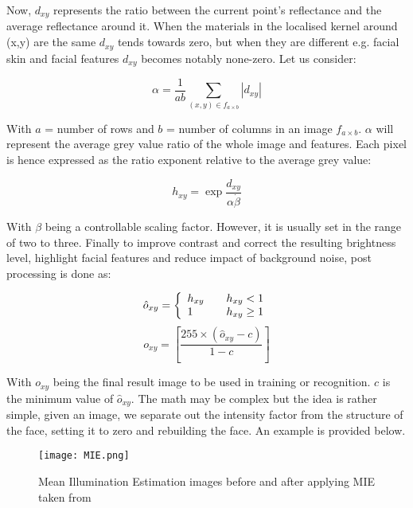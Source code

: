 	Now, $d_{xy}$ represents the ratio between the current point's reflectance and the average reflectance around it.  When the 
	materials in the localised kernel around (x,y) are the same $d_{xy}$ tends towards zero, but when they are different e.g. 
	facial skin and facial features $d_{xy}$ becomes notably none-zero.  Let us consider:
		
		\begin{equation}
			\alpha = \frac{1}{ab}\sum_{(x,y)\in f_{a \times b}} |d_{xy}| 
		\end{equation}
		
	With $a$ = number of rows and $b$ = number of columns in an image $f_{a \times b}$.  $\alpha$ will represent the average grey 
	value ratio of the whole image and features.  Each pixel is hence expressed as the ratio exponent relative to the average grey 
	value:
		
		\begin{equation}
			h_{xy} = \exp{\frac{d_{xy}}{\alpha \dot \beta}}
		\end{equation}
		
	With $\beta$ being a controllable scaling factor.  However, it is usually set in the range of two to three.  Finally to improve 
	contrast and correct the resulting brightness level, highlight facial features and reduce impact of background noise, post 
	processing is done as:
		
		\begin{equation}
			\hat{o}_{xy} = \left\{
				\begin{array}{l l}
					h_{xy} 	& \quad h_{xy} < 1 \\
					1 		& \quad h_{xy} \geq 1
				\end{array} \right.
		\end{equation}
		\begin{equation}
			o_{xy} = [\frac{255 \times (\hat{o}_{xy} -c)}{1-c}]
		\end{equation}
		
	With $o_{xy}$ being the final result image to be used in training or recognition.  $c$ is the minimum value of $\hat{o}_{xy}$.  
	The math may be complex but the idea is rather simple, given an image, we separate out the intensity factor from the structure 
	of the face, setting it to zero and rebuilding the face.  An example is provided below. 
	
		\begin{figure}[h!]
			\centering
			\caption{Mean Illumination Estimation images before and after applying MIE taken from~\cite{LuoaRINMBoMEfFR}\label{fig:MIE}}
			\texttt{[image: MIE.png]}
		\end{figure}

